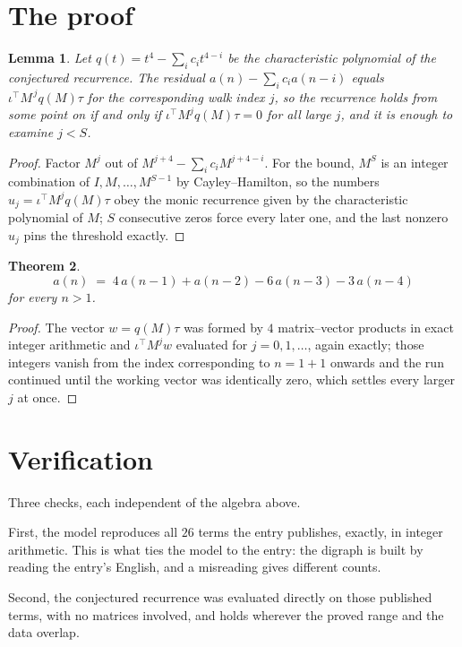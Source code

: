 \documentclass[11pt,a4paper]{article}
\theoremstyle{plain}
\newtheorem{theorem}{Theorem}
\newtheorem{lemma}[theorem]{Lemma}
\theoremstyle{definition}
\begin{document}
\section{The proof}

\begin{lemma}\label{lem:crit}
Let $q(t)=t^{4}-\sum_i c_it^{4-i}$ be the characteristic polynomial of the
conjectured recurrence. The residual $a(n)-\sum_ic_ia(n-i)$ equals
$\iota^{\!\top}M^{\,j}q(M)\tau$ for the corresponding walk index $j$, so the recurrence
holds from some point on if and only if $\iota^{\!\top}M^{j}q(M)\tau=0$ for all large $j$,
and it is enough to examine $j<S$.
\end{lemma}

\begin{proof}
Factor $M^{j}$ out of $M^{j+4}-\sum_ic_iM^{j+4-i}$. For the bound, $M^{S}$
is an integer combination of $I,M,\dots,M^{S-1}$ by Cayley--Hamilton, so the numbers
$u_j=\iota^{\!\top}M^{j}q(M)\tau$ obey the monic recurrence given by the characteristic
polynomial of $M$; $S$ consecutive zeros force every later one, and the last nonzero $u_j$
pins the threshold exactly.
\end{proof}

\begin{theorem}
\[
a(n)\;=\;4\,a(n-1) + a(n-2) - 6\,a(n-3) - 3\,a(n-4)
\]
for every $n>1$.
\end{theorem}

\begin{proof}
The vector $w=q(M)\tau$ was formed by $4$ matrix--vector products in exact integer
arithmetic and $\iota^{\!\top}M^{j}w$ evaluated for $j=0,1,\dots$, again exactly; those
integers vanish from the index corresponding to $n=1+1$ onwards and the run continued
until the working vector was identically zero, which settles every larger $j$ at once.
\end{proof}

\section{Verification}

Three checks, each independent of the algebra above.

First, the model reproduces all $26$ terms the entry publishes, exactly, in integer
arithmetic. This is what ties the model to the entry: the digraph is built by reading the
entry's English, and a misreading gives different counts.

Second, the conjectured recurrence was evaluated directly on those published terms, with no
matrices involved, and holds wherever the proved range and the data overlap.
\end{document}
